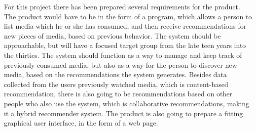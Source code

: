For this project there has been prepared several requirements for the product. The product would have to be in the form of a program, which allows a person to list media which he or she has consumed, and then receive recommendations for new pieces of media, based on previous behavior. The system should be approachable, but will have a focused target group from the late teen years into the thirties. The system should function as a way to manage and keep track of previously consumed media, but also as a way for the person to discover new media, based on the recommendations the system generates. Besides data collected from the users previously watched media, which is content-based recommendation, there is also going to be recommendations based on other people who also use the system, which is collaborative recommendations, making it a hybrid recommender system. The product is also going to prepare a fitting graphical user interface, in the form of a web page.

